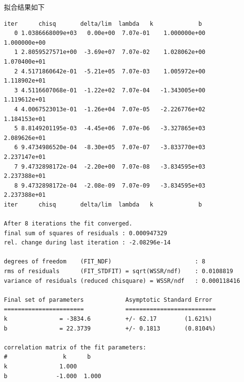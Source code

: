 \documentclass[11pt]{report}
\begin{document}
\begin{enumerate}
拟合结果如下
\begin{verbatim}
iter      chisq       delta/lim  lambda   k             b            
   0 1.0386668009e+03   0.00e+00  7.07e-01    1.000000e+00   1.000000e+00
   1 2.8059527571e+00  -3.69e+07  7.07e-02    1.028062e+00   1.070400e+01
   2 4.5171860642e-01  -5.21e+05  7.07e-03    1.005972e+00   1.118902e+01
   3 4.5116607068e-01  -1.22e+02  7.07e-04   -1.343005e+00   1.119612e+01
   4 4.0067523013e-01  -1.26e+04  7.07e-05   -2.226776e+02   1.184153e+01
   5 8.8149201195e-03  -4.45e+06  7.07e-06   -3.327865e+03   2.089626e+01
   6 9.4734986520e-04  -8.30e+05  7.07e-07   -3.833770e+03   2.237147e+01
   7 9.4732898172e-04  -2.20e+00  7.07e-08   -3.834595e+03   2.237388e+01
   8 9.4732898172e-04  -2.08e-09  7.07e-09   -3.834595e+03   2.237388e+01
iter      chisq       delta/lim  lambda   k             b            

After 8 iterations the fit converged.
final sum of squares of residuals : 0.000947329
rel. change during last iteration : -2.08296e-14

degrees of freedom    (FIT_NDF)                        : 8
rms of residuals      (FIT_STDFIT) = sqrt(WSSR/ndf)    : 0.0108819
variance of residuals (reduced chisquare) = WSSR/ndf   : 0.000118416

Final set of parameters            Asymptotic Standard Error
=======================            ==========================
k               = -3834.6          +/- 62.17        (1.621%)
b               = 22.3739          +/- 0.1813       (0.8104%)

correlation matrix of the fit parameters:
#                k      b      
k               1.000 
b              -1.000  1.000 

\end{verbatim}


\end{enumerate}
\end{document}

